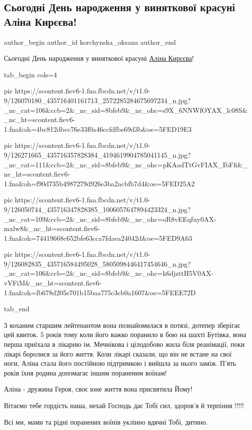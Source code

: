  
 
 
 
 
 
\subsection{Сьогодні День народження у виняткової красуні Аліна Кирєєва!}
\label{sec:19_11_2020.fb.korchynska_oksana.1.dr_alina_kireeva}
\ifcmt
	author_begin
   author_id korchynska_oksana
	author_end
\fi

Сьогодні День народження у виняткової красуні \href{https://www.facebook.com/alina.mastofanova}{Аліна Кирєєва}!

\ifcmt
tab_begin cols=4

pic https://scontent.fiev6-1.fna.fbcdn.net/v/t1.0-9/126070180_435716401161713_2572285284675697234_n.jpg?_nc_cat=106&ccb=2&_nc_sid=8bfeb9&_nc_ohc=s9X_6NNWfOYAX_lc08S&_nc_ht=scontent.fiev6-1.fna&oh=4bc812dbcc76e33f0a46ccfdfbe69d3b&oe=5FED19E3

pic https://scontent.fiev6-1.fna.fbcdn.net/v/t1.0-9/126271665_435716357828384_4194619904785041145_n.jpg?_nc_cat=111&ccb=2&_nc_sid=8bfeb9&_nc_ohc=pKAadTtGvFIAX_IbFfi&_nc_ht=scontent.fiev6-1.fna&oh=f90d735b4987279d926e3ba2acbfb7d4&oe=5FED25A2

pic https://scontent.fiev6-1.fna.fbcdn.net/v/t1.0-9/126050744_435716347828385_1006057647894423324_n.jpg?_nc_cat=109&ccb=2&_nc_sid=8bfeb9&_nc_ohc=oR8vEEqfuy0AX-mxlw8&_nc_ht=scontent.fiev6-1.fna&oh=74419668c652bfe63cca7fdaea24042d&oe=5FED9A63

pic https://scontent.fiev6-1.fna.fbcdn.net/v/t1.0-9/126082835_435716584495028_5805098446417454646_n.jpg?_nc_cat=106&ccb=2&_nc_sid=8bfeb9&_nc_ohc=k6djzttH5V0AX-vVFiM&_nc_ht=scontent.fiev6-1.fna&oh=fb678d205e701b15baa775c3cb0a1607&oe=5FEEE72D

tab_end
\fi

З коханим старшим лейтенантом вона познайомилася в потязі, дотепер зберігає цей
квиток. 5 років тому коли його важко поранило в бою на шахті Бутівка, вона
перша приїхала в лікарню ім. Мечнікова і цілодобово жила біля реанімації, поки
лікарі боролися за його життя.  Коли лікарі сказали, що він не встане на свої
ноги, Аліна стала його постійною підтримкою і вийшла за нього заміж.  П’ять
років їхня родина допомагає іншим пораненим воїнам! 

Аліна - дружина Героя, своє юне життя вона присвятила Йому! 

Вітаємо тебе гордість наша, нехай Господь дає Тобі сил, здоров’я й терпіння
!!!!!

Всі ми, мами та рідні поранених воїнів уклінно вдячні Тобі, дитино.
